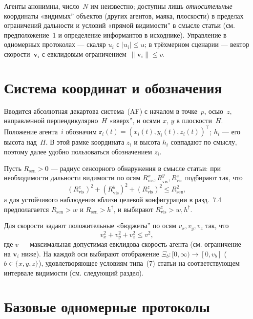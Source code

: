 \documentclass[12pt,a4paper]{article}
\begin{document}
Агенты анонимны, число~$N$ им неизвестно; доступны лишь \emph{относительные} координаты «видимых'' объектов (других агентов, маяка, плоскости) в пределах ограничений дальности и условий «прямой видимости'' в смысле статьи (см. предположение~1 и определение информантов в исходнике). Управление в одномерных протоколах --- скаляр $u_i$ с $|u_i|\le u$; в трёхмерном сценарии --- вектор скорости~$\mathbf{v}_i$ с евклидовым ограничением~$\|\mathbf{v}_i\|\le v$.

\section{Система координат и обозначения}

Вводится абсолютная декартова система~(AF) с началом в точке~$p$, осью~$z$, направленной перпендикулярно~$H$ «вверх'', и осями $x$, $y$ в плоскости~$H$. Положение агента~$i$ обозначим $\mathbf{r}_i(t)=(x_i(t),y_i(t),z_i(t))^\top$; $h_i$ --- его высота над~$H$. В этой рамке координата $z_i$ и высота $h_i$ совпадают по смыслу, поэтому далее удобно пользоваться обозначением $z_i$.

Пусть $R_{\mathrm{sen}}>0$ --- радиус сенсорного обнаружения в смысле статьи: при необходимости дальности видимости по осям $R_{\mathrm{vis}}^x,R_{\mathrm{vis}}^y,R_{\mathrm{vis}}^z$ подбирают так, что
\begin{equation}
  (R_{\mathrm{vis}}^x)^2+(R_{\mathrm{vis}}^y)^2+(R_{\mathrm{vis}}^z)^2 \le R_{\mathrm{sen}}^2,
\end{equation}
а для устойчивого наблюдения вблизи целевой конфигурации в разд.~7.4 предполагается $R_{\mathrm{sen}}>w$ и $R_{\mathrm{sen}}>h^\dagger$, и выбирают $R_{\mathrm{vis}}^z>w,h^\dagger$.

Для скорости задают положительные «бюджеты'' по осям $v_x,v_y,v_z$ так, что
\begin{equation}
  v_x^2+v_y^2+v_z^2 \le v^2,
\end{equation}
где $v$ --- максимальная допустимая евклидова скорость агента (см. ограничение на $\mathbf{v}_i$ ниже). На каждой оси выбирают отображение $\Xi_b:[0,\infty)\to[0,v_b]$ ($b\in\{x,y,z\}$), удовлетворяющее условиям типа~(7) статьи на соответствующем интервале видимости (см. следующий раздел).

\section{Базовые одномерные протоколы}
\end{document}
